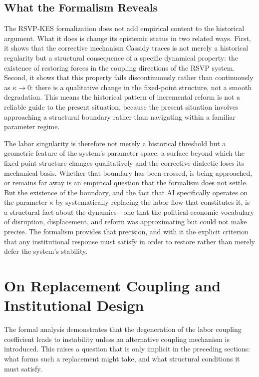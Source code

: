 \documentclass[11pt, a4paper]{article}
\theoremstyle{plain}
\theoremstyle{definition}
\newcommand{\coupling}{\kappa}
\begin{document}
\subsection{What the Formalism Reveals}

The RSVP-KES formalization does not add empirical content to the historical
argument. What it does is change its epistemic status in two related ways.
First, it shows that the corrective mechanism Cassidy traces is not merely
a historical regularity but a structural consequence of a specific dynamical
property: the existence of restoring forces in the coupling directions of the
RSVP system. Second, it shows that this property fails discontinuously rather
than continuously as $\coupling \to 0$: there is a qualitative change in the
fixed-point structure, not a smooth degradation. This means the historical
pattern of incremental reform is not a reliable guide to the present situation,
because the present situation involves approaching a structural boundary rather
than navigating within a familiar parameter regime.

The labor singularity is therefore not merely a historical threshold but a
geometric feature of the system's parameter space: a surface beyond which the
fixed-point structure changes qualitatively and the corrective dialectic loses
its mechanical basis. Whether that boundary has been crossed, is being
approached, or remains far away is an empirical question that the formalism
does not settle. But the existence of the boundary, and the fact that AI
specifically operates on the parameter $\coupling$ by systematically replacing
the labor flow that constitutes it, is a structural fact about the
dynamics---one that the political-economic vocabulary of disruption,
displacement, and reform was approximating but could not make precise. The
formalism provides that precision, and with it the explicit criterion that any
institutional response must satisfy in order to restore rather than merely
defer the system's stability.

\section*{On Replacement Coupling and Institutional Design}

The formal analysis demonstrates that the degeneration of the labor coupling
coefficient leads to instability unless an alternative coupling mechanism is
introduced. This raises a question that is only implicit in the preceding
sections: what forms such a replacement might take, and what structural
conditions it must satisfy.
\end{document}

